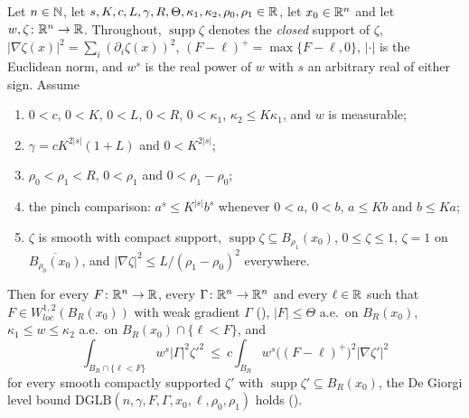 \begin{helper}
Let $n\in\mathbb{N}$, let $s,K,c,L,\gamma,R,\Theta,\kappa_1,\kappa_2,\rho_0,\rho_1\in\mathbb{R}$,
let $x_0\in\mathbb{R}^n$ and let $w,\zeta\colon\mathbb{R}^n\to\mathbb{R}$.  Throughout,
$\operatorname{supp}\zeta$ denotes the \emph{closed} support of $\zeta$,
$|\nabla\zeta(x)|^2=\sum_i(\partial_i\zeta(x))^2$, $(F-\ell)^+=\max\{F-\ell,0\}$,
$|\cdot|$ is the Euclidean norm, and $w^s$ is the real power of $w$ with $s$ an
arbitrary real of either sign.  Assume
\begin{enumerate}
\item[(H1)] $0<c$, $0<K$, $0<L$, $0<R$, $0<\kappa_1$,
  $\kappa_2\le K\kappa_1$, and $w$ is measurable;
\item[(H2)] $\gamma=cK^{2|s|}(1+L)$ and $0<K^{2|s|}$;
\item[(H3)] $\rho_0<\rho_1<R$, $0<\rho_1$ and $0<\rho_1-\rho_0$;
\item[(H4)] the pinch comparison: $a^s\le K^{|s|}b^s$ whenever $0<a$, $0<b$,
  $a\le Kb$ and $b\le Ka$;
\item[(H5)] $\zeta$ is smooth with compact support,
  $\operatorname{supp}\zeta\subseteq B_{\rho_1}(x_0)$, $0\le\zeta\le1$,
  $\zeta=1$ on $\overline{B_{\rho_0}(x_0)}$, and
  $|\nabla\zeta|^2\le L/(\rho_1-\rho_0)^2$ everywhere.
\end{enumerate}
Then for every $F\colon\mathbb{R}^n\to\mathbb{R}$, every $\Gamma\colon\mathbb{R}^n\to\mathbb{R}^n$ and every
$\ell\in\mathbb{R}$ such that $F\in W^{1,2}_{loc}(B_R(x_0))$ with weak gradient
$\Gamma$ (), $|F|\le\Theta$ a.e.\ on $B_R(x_0)$,
$\kappa_1\le w\le\kappa_2$ a.e.\ on $B_R(x_0)\cap\{\ell<F\}$, and
\[
\int_{B_R\cap\{\ell<F\}}w^s|\Gamma|^2\zeta'^2
\ \le\ c\int_{B_R}w^s\bigl((F-\ell)^+\bigr)^2|\nabla\zeta'|^2
\]
for every smooth compactly supported $\zeta'$ with
$\operatorname{supp}\zeta'\subseteq B_R(x_0)$, the De Giorgi level bound
$\mathrm{DGLB}(n,\gamma,F,\Gamma,x_0,\ell,\rho_0,\rho_1)$ holds
().
\end{helper}
